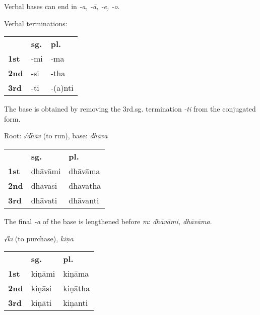 \documentclass[11pt,oneside]{memoir}
\begin{document}
Verbal bases can end in \emph{-a, -ā, -e, -o}.

{\centering\par
\begin{multicols}{2}

Verbal terminations:

\begin{center}
\begin{tabular}{lll}
 & \textbf{sg.} & \textbf{pl.}\\[0pt]
\textbf{1st} & -mi & -ma\\[0pt]
\textbf{2nd} & -si & -tha\\[0pt]
\textbf{3rd} & -ti & -(a)nti\\[0pt]
\end{tabular}
\end{center}

The base is obtained by removing the 3rd.sg. termination \emph{-ti} from the conjugated form.

\columnbreak

Root: \emph{√dhāv} (to run), base: \emph{dhāva}

\begin{center}
\begin{tabular}{lll}
 & \textbf{sg.} & \textbf{pl.}\\[0pt]
\textbf{1st} & dhāvāmi & dhāvāma\\[0pt]
\textbf{2nd} & dhāvasi & dhāvatha\\[0pt]
\textbf{3rd} & dhāvati & dhāvanti\\[0pt]
\end{tabular}
\end{center}

The final \emph{-a} of the base is lengthened before \emph{m}: \emph{dhāvāmi, dhāvāma}.

\end{multicols}

\begin{multicols}{3}

\emph{√kī} (to purchase), \emph{kiṇā}

\begin{center}
\begin{tabular}{lll}
 & \textbf{sg.} & \textbf{pl.}\\[0pt]
\textbf{1st} & kiṇāmi & kiṇāma\\[0pt]
\textbf{2nd} & kiṇāsi & kiṇātha\\[0pt]
\textbf{3rd} & kiṇāti & kiṇanti\\[0pt]
\end{tabular}
\end{center}


\end{multicols}}
\end{document}
